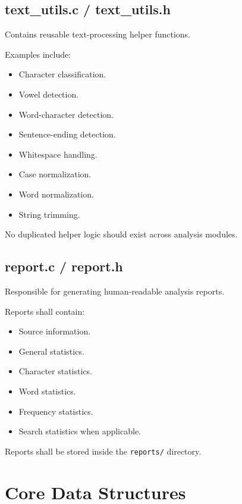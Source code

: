 \documentclass[12pt,a4paper]{article}
\begin{document}
\subsection{text\_utils.c / text\_utils.h}

Contains reusable text-processing helper functions.

Examples include:

\begin{itemize}
    \item Character classification.
    \item Vowel detection.
    \item Word-character detection.
    \item Sentence-ending detection.
    \item Whitespace handling.
    \item Case normalization.
    \item Word normalization.
    \item String trimming.
\end{itemize}

No duplicated helper logic should exist across analysis modules.

\subsection{report.c / report.h}

Responsible for generating human-readable analysis reports.

Reports shall contain:

\begin{itemize}
    \item Source information.
    \item General statistics.
    \item Character statistics.
    \item Word statistics.
    \item Frequency statistics.
    \item Search statistics when applicable.
\end{itemize}

Reports shall be stored inside the \texttt{reports/} directory.


\section{Core Data Structures}
\end{document}
